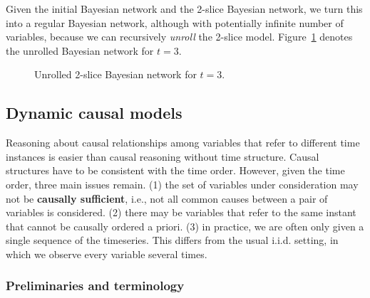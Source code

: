\documentclass{article}
\begin{document}
Given the initial Bayesian network and the 2-slice Bayesian network, we turn this into a regular Bayesian network, although with potentially infinite number of variables, because we can recursively \textit{unroll} the 2-slice model. Figure~\ref{fig:dbn2} denotes the unrolled Bayesian network for $t=3$. 

\begin{figure}[H]
    \centering
    \caption{Unrolled 2-slice Bayesian network for $t=3$.}
    \label{fig:dbn2}
\end{figure}

\subsection{Dynamic causal models}

Reasoning about causal relationships among variables that refer to different time instances is easier than causal reasoning without time structure. Causal structures have to be consistent with the time order. However, given the time order, three main issues remain. (1) the set of variables under consideration may not be \textbf{causally sufficient}, i.e., not all common causes between a pair of variables is considered. (2) there may be variables that refer to the same instant that cannot be causally ordered a priori. (3) in practice, we are often only given a single sequence of the timeseries. This differs from the usual i.i.d. setting, in which we observe every variable several times. 

\subsubsection{Preliminaries and terminology}
\end{document}
